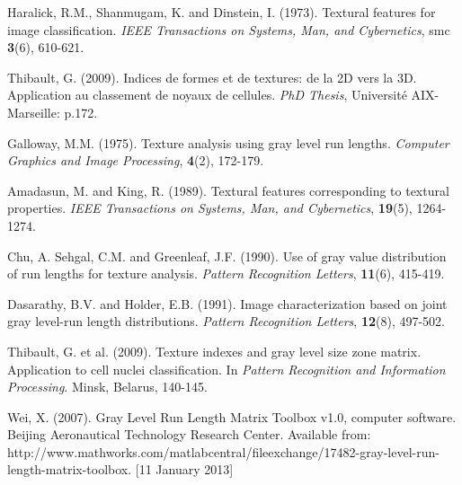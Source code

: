 \documentclass{article}
\begin{document}
\footnotesize
\begin{thebibliography}{99} %

	 Haralick, R.M., Shanmugam, K. and Dinstein, I. (1973).
			{Textural features for image classification}.
			{\em IEEE Transactions on Systems, Man, and Cybernetics}, smc \textbf{3}(6), 	
			610-621.	
	
		 Thibault, G. (2009). 
			{Indices de formes et de textures: de la 2D vers la 3D. Application au classement de noyaux de cellules}. 
			{\em PhD Thesis}, Universit\'e AIX-Marseille: p.172.
	
	 Galloway, M.M. (1975).
			{Texture analysis using gray level run lengths}.
			{\em Computer Graphics and Image Processing}, \textbf{4}(2), 172-179.	
			
	 Amadasun, M. and King, R. (1989).
			{Textural features corresponding to textural properties}.
			{\em IEEE Transactions on Systems, Man, and Cybernetics}, \textbf{19}(5), 1264-1274. 
			
	 Chu, A. Sehgal, C.M. and Greenleaf, J.F. (1990).
			{Use of gray value distribution of run lengths for texture analysis}.
			{\em Pattern Recognition Letters}, \textbf{11}(6), 415-419.
			
	 Dasarathy, B.V. and Holder, E.B. (1991).
			{Image characterization based on joint gray level-run length distributions}.
			{\em Pattern Recognition Letters}, \textbf{12}(8), 497-502.
			
	 Thibault, G. et al. (2009).
			{Texture indexes and gray level size zone matrix. Application to cell nuclei 
			classification}. In {\em Pattern Recognition and Information Processing}. 
			Minsk, Belarus, 140-145.
			
	 Wei, X. (2007). 
			{Gray Level Run Length Matrix Toolbox v1.0, computer software}.
			{Beijing Aeronautical Technology Research Center}.
			{Available from: http://www.mathworks.com/matlabcentral/fileexchange/17482-gray-level-run-length-matrix-toolbox}. [11 January 2013]
			
\end{thebibliography}
\end{document}
